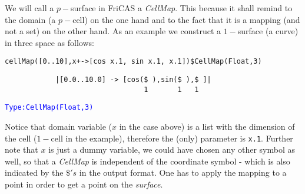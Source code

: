 \documentclass[12pt,a4paper]{article}
\newcommand{\type}[1]{\textcolor{blue}{\tt\tiny #1}}
\begin{document}
We will call a $p-$surface in FriCAS a {\em CellMap}. This because it 
shall remind to the domain (a $p-$cell) on the one hand and to the fact 
that it is a mapping (and not a set) on the other hand. As an example
we construct a $1-$surface (a curve) in three space as follows:
\begin{lstlisting}
cellMap([0..10],x+->[cos x.1, sin x.1, x.1])$CellMap(Float,3)
\end{lstlisting} 
\begin{verbatim}
            |[0.0..10.0] -> [cos($ ),sin($ ),$ ]|
                                 1       1   1                                     
\end{verbatim}
\type{Type:CellMap(Float,3)}

%


Notice that domain variable ($x$ in the case above) is a list with the
dimension of the cell ($1-$cell in the example), therefore the (only)
parameter is {\tt x.1}. Further note that $x$ is just a dummy variable,
we could have chosen any other symbol as well, so that a {\em CellMap}
is independent of the coordinate symbol - which is also indicated by
the $\$'s$ in the output format. One has to apply the mapping to a 
point in order to get a point on the {\it surface}.
%
\end{document}
